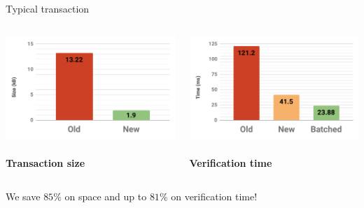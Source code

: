 \documentclass[aspectratio=169]{beamer}
\begin{document}
\begin{frame}{Typical transaction}
\begin{columns}
\begin{column}{0.5\textwidth}
\centering
\includegraphics[width=\textwidth]{txn-size-2-2.pdf} \\~\\
\textbf{Transaction size}
\end{column}
\begin{column}{0.5\textwidth}
\centering
\includegraphics[width=\textwidth]{txn-time-2-2.pdf} \\~\\
\textbf{Verification time}
\end{column}
\end{columns}
\begin{center}
We save $85\%$ on space and up to $81\%$ on verification time!
\end{center}
\end{frame}
\end{document}
